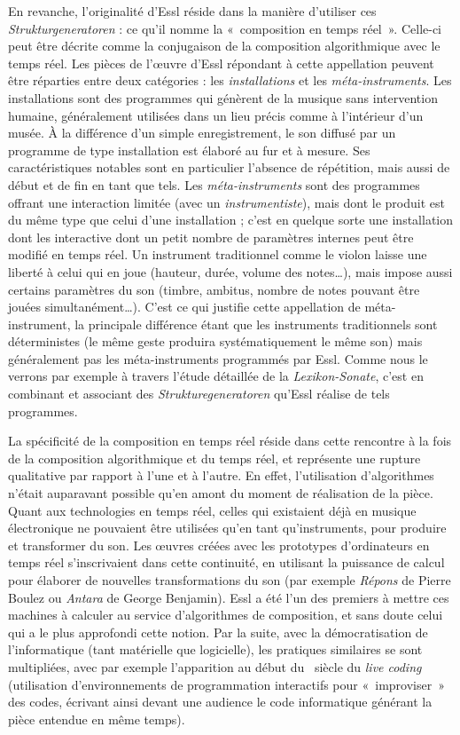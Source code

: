 \documentclass[a4paper,12pt]{article}
\newcommand{\guill}[1]{«~#1~»}
\begin{document}
En revanche, l'originalité d'Essl réside dans la manière d'utiliser ces \emph{Strukturgeneratoren} : ce qu'il nomme la \guill{composition en temps réel}. Celle-ci peut être décrite comme la conjugaison de la composition algorithmique avec le temps réel. Les pièces de l'œuvre d'Essl répondant à cette appellation peuvent être réparties entre deux catégories : les \emph{installations} et les \emph{méta-instruments}. Les installations sont des programmes qui génèrent de la musique sans intervention humaine, généralement utilisées dans un lieu précis comme à l'intérieur d'un musée. À la différence d'un simple enregistrement, le son diffusé par un programme de type installation est élaboré au fur et à mesure. Ses caractéristiques notables sont en particulier l'absence de répétition, mais aussi de début et de fin en tant que tels. Les \emph{méta-instruments} sont des programmes offrant une interaction limitée (avec un \emph{instrumentiste}), mais dont le produit est du même type que celui d'une installation ; c'est en quelque sorte une installation dont les interactive dont un petit nombre de paramètres internes peut être modifié en temps réel. Un instrument traditionnel comme le violon laisse une liberté à celui qui en joue (hauteur, durée, volume des notes\dots), mais impose aussi certains paramètres du son (timbre, ambitus, nombre de notes pouvant être jouées simultanément\dots). C'est ce qui justifie cette appellation de méta-instrument, la principale différence étant que les instruments traditionnels sont déterministes (le même geste produira systématiquement le même son) mais généralement pas les méta-instruments programmés par Essl. Comme nous le verrons par exemple à travers l'étude détaillée de la \emph{Lexikon-Sonate}, c'est en combinant et associant des \emph{Strukturegeneratoren} qu'Essl réalise de tels programmes.

La spécificité de la composition en temps réel réside dans cette rencontre à la fois de la composition algorithmique et du temps réel, et représente une rupture qualitative par rapport à l'une et à l'autre. En effet, l'utilisation d'algorithmes n'était auparavant possible qu'en amont du moment de réalisation de la pièce. Quant aux technologies en temps réel, celles qui existaient déjà en musique électronique ne pouvaient être utilisées qu'en tant qu'instruments, pour produire et transformer du son. Les œuvres créées avec les prototypes d'ordinateurs en temps réel s'inscrivaient dans cette continuité, en utilisant la puissance de calcul pour élaborer de nouvelles transformations du son (par exemple \emph{Répons} de Pierre Boulez ou \emph{Antara} de George Benjamin). Essl a été l'un des premiers à mettre ces machines à calculer au service d'algorithmes de composition, et sans doute celui qui a le plus approfondi cette notion. Par la suite, avec la démocratisation de l'informatique (tant matérielle que logicielle), les pratiques similaires se sont multipliées, avec par exemple l'apparition au début du \XXIe~siècle du \emph{live coding} (utilisation d'environnements de programmation interactifs pour \guill{improviser} des codes, écrivant ainsi devant une audience le code informatique générant la pièce entendue en même temps).
\end{document}
